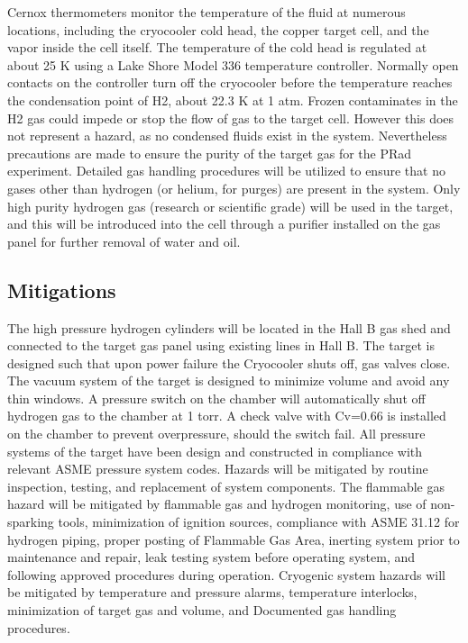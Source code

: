 Cernox thermometers monitor the temperature of the fluid at numerous locations,
including the cryocooler cold head, the copper target cell, and the vapor inside the cell
itself. The temperature of the cold head is regulated at about 25 K using a Lake Shore
Model 336 temperature controller. Normally open contacts on the controller turn off the
cryocooler before the temperature reaches the condensation point of H2, about 22.3 K at
1 atm.
Frozen contaminates in the H2 gas could impede or stop the flow of gas to the target
cell. However this does not represent a hazard, as no condensed fluids exist in the system.
Nevertheless precautions are made to ensure the purity of the target gas for the PRad
experiment. Detailed gas handling procedures will be utilized to ensure that no gases
other than hydrogen (or helium, for purges) are present in the system. Only high purity
hydrogen gas (research or scientific grade) will be used in the target, and this will be
introduced into the cell through a purifier installed on the gas panel for further removal
of water and oil.


\subsection{Mitigations}
The high pressure hydrogen cylinders will be located in the Hall B gas shed and connected
to the target gas panel using existing lines in Hall B. The target is designed such that
upon power failure the Cryocooler shuts off, gas valves close. The vacuum system of the
target is designed to minimize volume and avoid any thin windows. A pressure switch
on the chamber will automatically shut off hydrogen gas to the chamber at 1 torr. A
check valve with Cv=0.66 is installed on the chamber to prevent overpressure, should
the switch fail. All pressure systems of the target have been design and constructed in
compliance with relevant ASME pressure system codes. Hazards will be mitigated by
routine inspection, testing, and replacement of system components. The flammable gas
hazard will be mitigated by flammable gas and hydrogen monitoring, use of non-sparking
tools, minimization of ignition sources, compliance with ASME 31.12 for hydrogen piping,
proper posting of Flammable Gas Area, inerting system prior to maintenance and repair,
leak testing system before operating system, and following approved procedures during
operation. Cryogenic system hazards will be mitigated by temperature and pressure
alarms, temperature interlocks, minimization of target gas and volume, and Documented
gas handling procedures.

